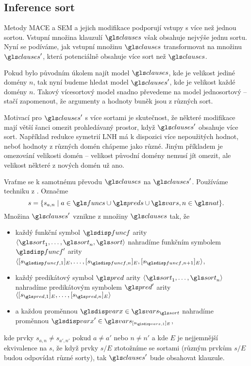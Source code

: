 \subsection{Inference sort}

Metody MACE a SEM a jejich modifikace podporují vstupy s více než
jednou sortou. Vstupní množina klauzulí $\clauses$ však obsahuje
nejvýše jednu sortu. Nyní se podíváme, jak vstupní množinu
$\clauses$ transformovat
na množinu $\clauses'$, která potenciálně
obsahuje více sort než $\clauses$.

Pokud bylo původním úkolem najít model $\clauses$, kde je velikost
jediné domény $n$, tak nyní budeme hledat model $\clauses'$,
kde je velikost každé domény $n$. Takový vícesortový
model snadno převedeme na model jednosortový -- stačí zapomenout,
že argumenty a hodnoty buněk jsou z různých sort.

Motivací pro $\clauses'$ s více sortami je skutečnost,
že některé modifikace mají větší šanci omezit prohledávaný prostor,
když $\clauses'$ obsahuje více sort. Například
redukce symetrií LNH má k dispozici více nepoužitých hodnot,
neboť hodnoty z různých domén chápeme jako různé.
Jiným příkladem je omezování velikosti domén -- velikost původní domény
nemusí jít omezit, ale velikost některé z nových domén už ano.

Vraťme se k samotnému převodu $\clauses$ na $\clauses'$.
Používáme techniku z \cite{claessen03paradox}.
Označme
\[
  s = \{ s_{a, n} \mid  a \in \funcs \cup \preds \cup \vars, n \in \nat\}.
\]
Množina $\clauses'$ vznikne z množiny $\clauses$ tak, že
\begin{itemize}
\item každý funkční symbol $\func$ arity
  $\langle \sort_1 \comdots \sort_n, \sort \rangle$
  nahradíme funkčním symbolem $\func'$ arity
  $\langle [s_{\func, 1}]_E \comdots [s_{\func, n}]_E, [s_{\func, n + 1}]_E \rangle$,
\item každý predikátový symbol $\pred$ arity
  $\langle \sort_1 \comdots \sort_n \rangle$
  nahradíme predikátovým symbolem $\pred'$ arity
  $\langle [s_{\pred, 1}]_E \comdots [s_{\pred, n}]_E \rangle$
\item a každou proměnnou $\var \in \vars_\sort$ nahradíme
  proměnnou $\var' \in \vars_{[s_{\var, 1}]_E}$,
\end{itemize}
kde prvky $s_{a, n} \neq s_{a', n'}$ pokud $a \neq a'$ nebo $n \neq n'$
a kde $E$ je nejjemnější ekvivalence na $s$, že když prvky $s/E$
ztotožníme se sortami (různým prvkům $s/E$ budou odpovídat různé sorty),
tak $\clauses'$ bude obsahovat klauzule.

